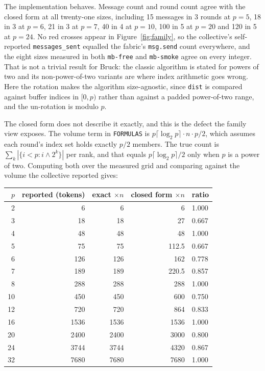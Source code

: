 \documentclass[11pt]{article}
\begin{document}
The implementation behaves. Message count and round count agree with the closed form at all
twenty-one sizes, including 15 messages in 3 rounds at $p=5$, 18 in 3 at $p=6$, 21 in 3 at
$p=7$, 40 in 4 at $p=10$, 100 in 5 at $p=20$ and 120 in 5 at $p=24$. No red crosses appear in
Figure~\ref{fig:family}, so the collective's self-reported \texttt{messages\_sent} equalled the
fabric's \texttt{msg.send} count everywhere, and the eight sizes measured in both
\texttt{mb-free} and \texttt{mb-smoke} agree on every integer. That is not a trivial result for
Bruck: the classic algorithm is stated for powers of two and its non-power-of-two variants are
where index arithmetic goes wrong. Here the rotation makes the algorithm size-agnostic, since
\texttt{dist} is compared against buffer indices in $[0, p)$ rather than against a padded
power-of-two range, and the un-rotation is modulo $p$.

The closed form does not describe it exactly, and this is the defect the family view exposes.
The volume term in \texttt{FORMULAS} is $p\lceil\log_2 p\rceil \cdot n \cdot p/2$, which
assumes each round's index set holds exactly $p/2$ members. The true count is
$\sum_k |\{i < p : i \wedge 2^k\}|$ per rank, and that equals $p\lceil\log_2 p\rceil/2$ only
when $p$ is a power of two. Computing both over the measured grid and comparing against the
volume the collective reported gives:

\begin{center}\footnotesize
\begin{tabular}{@{}rrrrl@{}}
\toprule
$p$ & reported (tokens) & exact $\times n$ & closed form $\times n$ & ratio \\
\midrule
 2 &     6 &     6 &     6 & 1.000 \\
 3 &    18 &    18 &    27 & 0.667 \\
 4 &    48 &    48 &    48 & 1.000 \\
 5 &    75 &    75 &   112.5 & 0.667 \\
 6 &   126 &   126 &   162 & 0.778 \\
 7 &   189 &   189 &   220.5 & 0.857 \\
 8 &   288 &   288 &   288 & 1.000 \\
10 &   450 &   450 &   600 & 0.750 \\
12 &   720 &   720 &   864 & 0.833 \\
16 &  1536 &  1536 &  1536 & 1.000 \\
20 &  2400 &  2400 &  3000 & 0.800 \\
24 &  3744 &  3744 &  4320 & 0.867 \\
32 &  7680 &  7680 &  7680 & 1.000 \\
\bottomrule
\end{tabular}\normalsize
\end{center}
\end{document}
